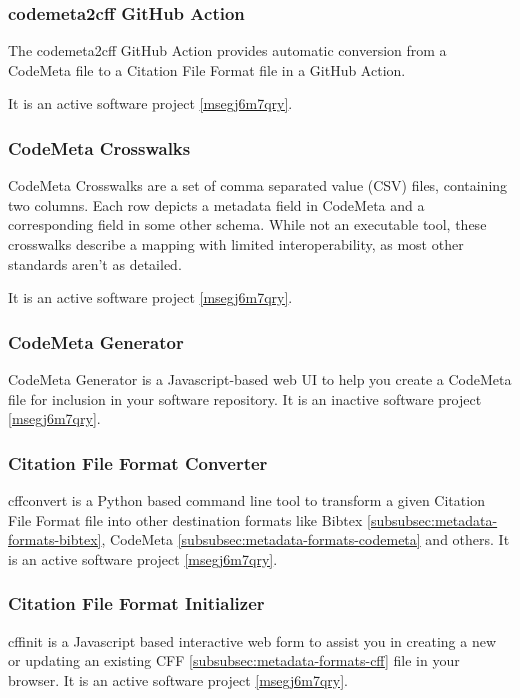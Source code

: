 \documentclass{article}
\begin{document}
\subsubsection{codemeta2cff GitHub Action}\label{tk14z3o75c5t}
The codemeta2cff GitHub Action\cite{138880/U54AXTI4} provides automatic conversion from a CodeMeta file to a Citation File Format file in a GitHub Action.

It is an active software project \ref{msegj6m7qry}.



\subsubsection{CodeMeta Crosswalks}\label{ks3fezwj69ji}
CodeMeta Crosswalks \cite{11045035/2G9VU24E} are a set of comma separated value (CSV) files, containing two columns. Each row depicts a metadata field in CodeMeta and a corresponding field in some other schema. While not an executable tool, these crosswalks describe a mapping with limited interoperability, as most other standards aren’t as detailed.

It is an active software project \ref{msegj6m7qry}.



\subsubsection{CodeMeta Generator}\label{vuql4sg8sy2}
CodeMeta Generator \cite{11045035/BGVLLAZ8} is a Javascript-based web UI to help you create a CodeMeta file for inclusion in your software repository. It is an inactive software project \ref{msegj6m7qry}.



\subsubsection{Citation File Format Converter}\label{dfofurxomlo4}
cffconvert \cite{11045035/3EAAUM9S} is a Python based command line tool to transform a given Citation File Format  file into other destination formats like Bibtex \ref{subsubsec:metadata-formats-bibtex}, CodeMeta \ref{subsubsec:metadata-formats-codemeta} and others. It is an active software project \ref{msegj6m7qry}.



\subsubsection{Citation File Format Initializer}\label{bv2fu3l3kcxk}
cffinit \cite{11045035/244Q39FZ} is a Javascript based interactive web form to assist you in creating a new or updating an existing CFF \ref{subsubsec:metadata-formats-cff} file in your browser. It is an active software project \ref{msegj6m7qry}.
\end{document}
